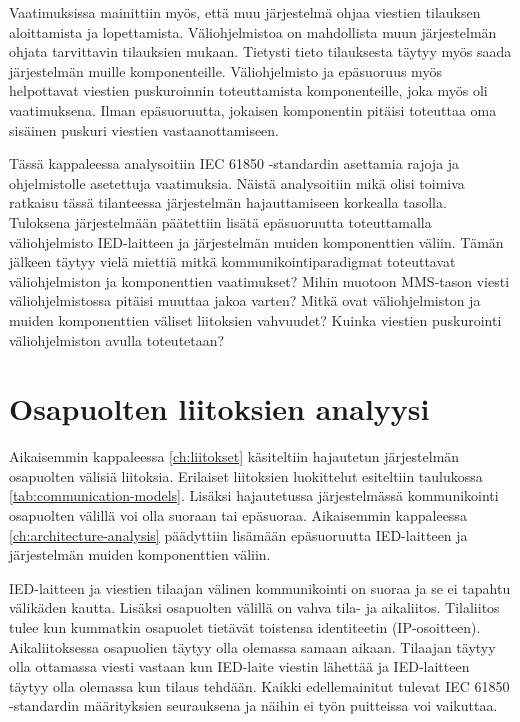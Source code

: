 Vaatimuksissa mainittiin myös, että muu järjestelmä ohjaa viestien tilauksen aloittamista ja lopettamista. Väliohjelmistoa on mahdollista muun järjestelmän ohjata tarvittavin tilauksien mukaan. Tietysti tieto tilauksesta täytyy myös saada järjestelmän muille komponenteille. Väliohjelmisto ja epäsuoruus myös helpottavat viestien puskuroinnin toteuttamista komponenteille, joka myös oli vaatimuksena. Ilman epäsuoruutta, jokaisen komponentin pitäisi toteuttaa oma sisäinen puskuri viestien vastaanottamiseen.

Tässä kappaleessa analysoitiin IEC 61850 -standardin asettamia rajoja ja ohjelmistolle asetettuja vaatimuksia. Näistä analysoitiin mikä olisi toimiva ratkaisu tässä tilanteessa järjestelmän hajauttamiseen korkealla tasolla. Tuloksena järjestelmään päätettiin lisätä epäsuoruutta toteuttamalla väliohjelmisto IED-laitteen ja järjestelmän muiden komponenttien väliin. Tämän jälkeen täytyy vielä miettiä mitkä kommunikointiparadigmat toteuttavat väliohjelmiston ja komponenttien vaatimukset? Mihin muotoon MMS-tason viesti väliohjelmistossa pitäisi muuttaa jakoa varten? Mitkä ovat väliohjelmiston ja muiden komponenttien väliset liitoksien vahvuudet? Kuinka viestien puskurointi väliohjelmiston avulla toteutetaan?


\section{Osapuolten liitoksien analyysi}
Aikaisemmin kappaleessa \ref{ch:liitokset} käsiteltiin hajautetun järjestelmän osapuolten välisiä liitoksia. Erilaiset liitoksien luokittelut esiteltiin taulukossa \ref{tab:communication-models}. Lisäksi hajautetussa järjestelmässä kommunikointi osapuolten välillä voi olla suoraan tai epäsuoraa. Aikaisemmin kappaleessa \ref{ch:architecture-analysis} päädyttiin lisämään epäsuoruutta IED-laitteen ja järjestelmän muiden komponenttien väliin.

IED-laitteen ja viestien tilaajan välinen kommunikointi on suoraa ja se ei tapahtu välikäden kautta. Lisäksi osapuolten välillä on vahva tila- ja aikaliitos. Tilaliitos tulee kun kummatkin osapuolet tietävät toistensa identiteetin (IP-osoitteen). Aikaliitoksessa osapuolien täytyy olla olemassa samaan aikaan. Tilaajan täytyy olla ottamassa viesti vastaan kun IED-laite viestin lähettää ja IED-laitteen täytyy olla olemassa kun tilaus tehdään. Kaikki edellemainitut tulevat IEC 61850 -standardin määrityksien seurauksena ja näihin ei työn puitteissa voi vaikuttaa.

